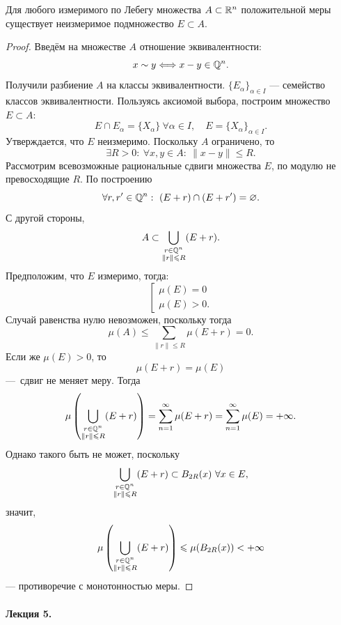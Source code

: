 \begin{theorem}
    Для любого измеримого по Лебегу множества $A \subset \mathbb{R}^n$ положительной меры существует неизмеримое подмножество $E \subset A$.
\end{theorem} 
\begin{proof}
    Введём на множестве $A$ отношение эквивалентности:
    \[x \sim y \Longleftrightarrow x - y \in \mathbb{Q}^n.\]
    Получили разбиение $A$ на классы эквивалентности.
    $\{E_{\alpha}\}_{\alpha \in I}$ — семейство классов эквивалентности. 
    Пользуясь аксиомой выбора, построим множество $E \subset A$:
    \[E \cap E_\alpha = \{X_\alpha\} \ \forall \alpha \in I, \quad E = \{X_\alpha\}_{\alpha \in I}.\]
    Утверждается, что $E$ неизмеримо.
    Поскольку $A$ ограничено, то
    \[\exists R > 0: \ \forall x, y \in A: \ \|x-y\| \leqslant R.\]
    Рассмотрим всевозможные рациональные сдвиги множества $E$, по модулю не превосходящие $R$.
    По построению
    \[\forall r, r' \in \mathbb{Q}^n: \ (E + r) \cap (E + r') = \varnothing.\]
    С другой стороны,
    \[A \subset \bigcup\limits_{\substack{r \in \mathbb{Q}^n \\ \|r\| \leqslant R}} (E + r).\]
    Предположим, что $E$ измеримо, тогда:
        \[
        \left[
        \begin{aligned}
        \mu(E) = 0 \\
        \mu(E) > 0.
        \end{aligned}
        \right.
    \]
    Случай равенства нулю невозможен, поскольку тогда 
    \[\mu(A) \leqslant \sum\limits_{\|r\| \leqslant R} \mu(E + r) = 0.\]
    Если же $\mu(E) > 0$, то
    \[\mu(E + r) = \mu(E)\]
    — сдвиг не меняет меру.
    Тогда
    \[\mu\left(\bigcup\limits_{\substack{r \in \mathbb{Q}^n \\ \|r\| \leqslant R}} (E + r)\right) = \sum\limits_{n=1}^{\infty} \mu(E + r) = \sum\limits_{n=1}^{\infty} \mu(E) = +\infty.\]
    Однако такого быть не может, поскольку
    \[\bigcup\limits_{\substack{r \in \mathbb{Q}^n \\ \|r\| \leqslant R}} (E + r) \subset B_{2R} (x) \ \forall x \in E,\]
    значит,
    \[\mu\left(\bigcup\limits_{\substack{r \in \mathbb{Q}^n \\ \|r\| \leqslant R}} (E + r)\right) \leqslant \mu(B_{2R}(x)) < + \infty\]
    — противоречие с монотонностью меры.
\end{proof} 


\paragraph{Лекция 5.}


